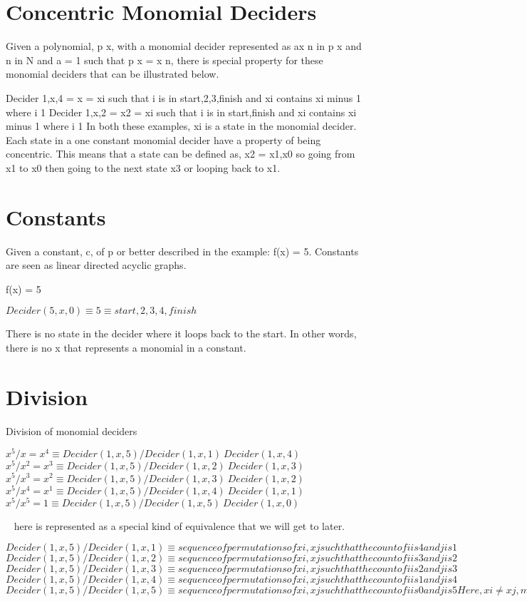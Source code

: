 \section{Concentric Monomial Deciders}

Given a polynomial, p x, with a monomial decider represented as ax n in p x and n in N and a = 1 such that p x = x n, there is special property for these monomial deciders that can be illustrated below.

Decider 1,x,4 = x = xi such that i is in start,2,3,finish and xi contains xi minus 1 where i 1
 Decider 1,x,2 = x2 = xi such that i is in start,finish and xi contains xi minus 1 where i 1
 In both these examples, xi is a state in the monomial decider.
Each state in a one constant monomial decider have a property of being concentric. This means that a state can be defined as, x2 =
 x1,x0 so going from x1 to x0 then going to the next state x3 or looping back to x1.
 
\section{Constants}

Given a constant, c, of p or better described in the example: f(x) = 5. Constants are seen as linear directed acyclic graphs.

f(x) = 5

$Decider(5,x,0) \equiv 5 \equiv {start,2,3,4,finish}$

There is no state in the decider where it loops back to the start. In other words, there is no x that represents a monomial in a constant.

\section{Division}

Division of monomial deciders


$x^5 / x = x^4 \equiv Decider(1,x,5)/Decider(1,x,1) ~ Decider(1,x,4)$
$x^5 / x^2 = x^3 \equiv Decider(1,x,5)/Decider(1,x,2) ~ Decider(1,x,3)$
$x^5 / x^3 = x^2 \equiv Decider(1,x,5)/Decider(1,x,3) ~ Decider(1,x,2)$
$x^5 / x^4 = x^1 \equiv Decider(1,x,5)/Decider(1,x,4) ~ Decider(1,x,1)$
$x^5 / x^5 = 1 \equiv Decider(1,x,5)/Decider(1,x,5) ~ Decider(1,x,0)$

~ here is represented as a special kind of equivalence that we will get to later.

$Decider(1,x,5)/Decider(1,x,1) \equiv
 {sequence of permutations of {xi,xj} such that the count of i is 4 and j is 1}$
$Decider(1,x,5)/Decider(1,x,2) \equiv
 {sequence of permutations of {xi,xj} such that the count of i is 3 and j is 2}$
$Decider(1,x,5)/Decider(1,x,3) \equiv
 {sequence of permutations of {xi,xj} such that the count of i is 2 and j is 3}$
$Decider(1,x,5)/Decider(1,x,4) \equiv
 {sequence of permutations of {xi,xj} such that the count of i is 1 and j is 4}$
$Decider(1,x,5)/Decider(1,x,5) \equiv
 {sequence of permutations of {xi,xj} such that the count of i is 0 and j is 5} Here, xi \neq
 xj, meaning xi is of a different representation than xj$

